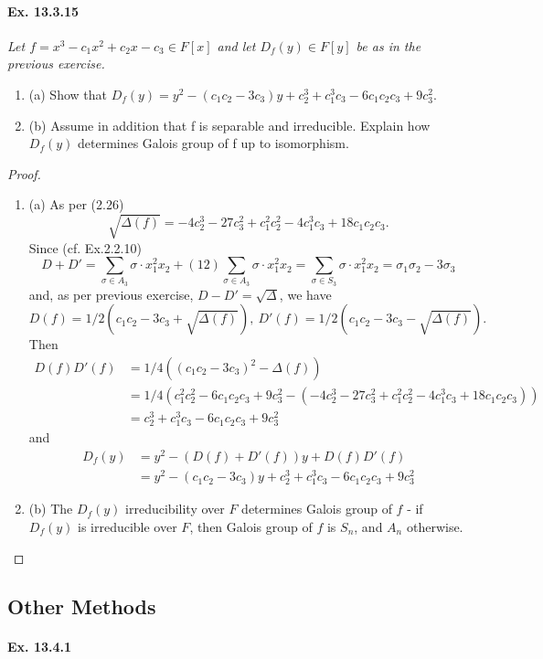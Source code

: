 \documentclass[11pt,a4paper]{article}
\newcommand{\be} {\begin{enumerate}}
\newcommand{\ee} {\end{enumerate}}
\begin{document}
\paragraph{Ex. 13.3.15}

{\it Let $f=x^3-c_1x^2+c_2x-c_3 \in F[x]$ and let $D_f(y) \in F[y]$ be as in the previous exercise.
\be
\item[(a)] Show that $D_f(y)=y^2-(c_1c_2-3c_3)y+c_2^3+c_1^3c_3-6c_1c_2c_3+9c_3^2$.
\item[(b)] Assume in addition that f is separable and irreducible. Explain how $D_f(y)$ determines Galois group of f up to isomorphism.
\ee

\begin{proof}
\be
\item[(a)] As per (2.26)
$$\sqrt{\Delta(f)}=-4c_2^3-27c_3^2+c_1^2c_2^2-4c_1^3c_3+18c_1c_2c_3.$$
Since (cf. Ex.2.2.10) $$D+D'=\sum_{\sigma \in A_3}\sigma\cdot x_1^2x_2+(12)\sum_{\sigma \in A_3}\sigma\cdot x_1^2x_2=\sum_{\sigma \in S_3}\sigma\cdot x_1^2x_2=\sigma_1\sigma_2-3\sigma_3$$ 
and, as per previous exercise, $D-D'=\sqrt\Delta$, we have $$D(f)=1/2(c_1c_2-3c_3+\sqrt{\Delta(f)}), ~ D'(f)=1/2(c_1c_2-3c_3-\sqrt{\Delta(f)}).$$
Then 
\begin{align*}
 D(f)D'(f) & =1/4((c_1c_2-3c_3)^2-\Delta(f)) \\
& =1/4(c_1^2c_2^2-6c_1c_2c_3+9c_3^2-(-4c_2^3-27c_3^2+c_1^2c_2^2-4c_1^3c_3+18c_1c_2c_3)) \\
& = c_2^3+c_1^3c_3-6c_1c_2c_3+9c_3^2
\end{align*}
and 
\begin{align*}
D_f(y) &=y^2-(D(f)+D'(f))y+D(f)D'(f) \\
& =y^2-(c_1c_2-3c_3)y+c_2^3+c_1^3c_3-6c_1c_2c_3+9c_3^2
\end{align*}
\item[(b)] The $D_f(y)$ irreducibility  over $F$ determines Galois group of $f$ - if $D_f(y)$ is irreducible over $F$, then  Galois group of $f$ is $S_n$, and $A_n$ otherwise.
\ee
\end{proof}
}

\subsection{Other Methods}

\paragraph{Ex. 13.4.1}
\end{document}
